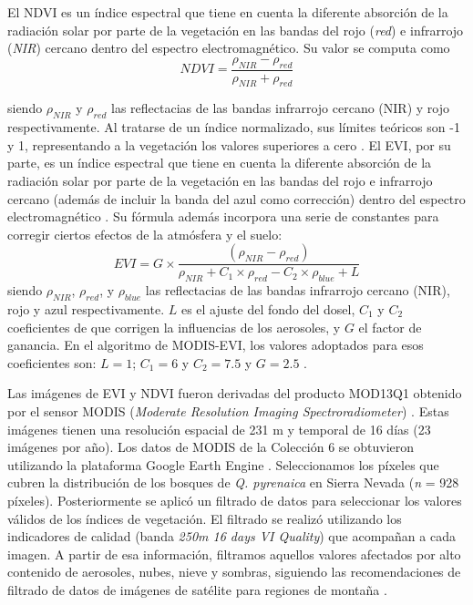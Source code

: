 El NDVI es un índice espectral que tiene en cuenta la diferente absorción de la radiación solar por parte de la vegetación en las bandas del rojo (\emph{red}) e infrarrojo (\emph{NIR}) cercano dentro del espectro electromagnético. Su valor se computa como \[NDVI = \frac{\rho_{NIR} - \rho_{red}}{\rho_{NIR} + \rho_{red}}\]

siendo \(\rho_{NIR}\) y \(\rho_{red}\) las reflectacias de las bandas infrarrojo cercano (NIR) y rojo respectivamente. Al tratarse de un índice normalizado, sus límites teóricos son -1 y 1, representando a la
vegetación los valores superiores a cero \autocites{Hueteetal2002OverviewRadiometric}. El EVI, por su parte, es un índice espectral que tiene en cuenta la diferente absorción de la radiación solar por parte de la vegetación en las bandas del rojo e infrarrojo cercano (además de incluir la banda del azul como corrección)
dentro del espectro electromagnético \autocites{Hueteetal2002OverviewRadiometric}. Su fórmula además incorpora una serie de constantes para corregir ciertos efectos de la atmósfera y el suelo:
\[EVI = G\times\frac{(\rho_{NIR}-\rho_{red})}{\rho_{NIR} + C_{1} \times \rho_{red} - C_{2}\times \rho_{blue} + L}\]
siendo \(\rho_{NIR}\), \(\rho_{red}\), y \(\rho_{blue}\) las reflectacias de las bandas infrarrojo cercano (NIR), rojo y azul respectivamente. \(L\) es el ajuste del fondo del dosel, \(C_{1}\) y \(C_{2}\) coeficientes de que corrigen la influencias de los aerosoles, y \(G\) el factor de ganancia. En el algoritmo de MODIS-EVI, los valores adoptados para esos coeficientes son: \(L = 1\); \(C_{1} = 6\) y \(C_{2}=7.5\) y \(G = 2.5\) \autocites{Hueteetal2002OverviewRadiometric}.

Las imágenes de EVI y NDVI fueron derivadas del producto MOD13Q1 obtenido por el sensor MODIS (\emph{Moderate Resolution Imaging Spectroradiometer}) \autocites{Didan2015MOD13Q1MODIS}. Estas imágenes tienen una resolución espacial de 231 m y temporal de 16 días (23 imágenes por año). Los datos de MODIS de la Colección 6 se obtuvieron utilizando la plataforma Google Earth Engine \autocites{Gorelicketal2017GoogleEarth}. Seleccionamos los píxeles que cubren la distribución de los bosques de \emph{Q. pyrenaica} en Sierra Nevada (\emph{n} = 928 píxeles). Posteriormente se aplicó un filtrado de datos para seleccionar los valores válidos de los índices de vegetación. El filtrado se realizó utilizando los indicadores de calidad (banda \emph{250m 16 days VI Quality}) que acompañan a cada imagen. A partir de esa información, filtramos aquellos valores afectados por alto contenido de aerosoles, nubes, nieve y sombras, siguiendo las recomendaciones de filtrado de datos de imágenes de satélite para regiones de montaña \autocites{ReyesDiezetal2015ImplicacionesFiltrado}.

